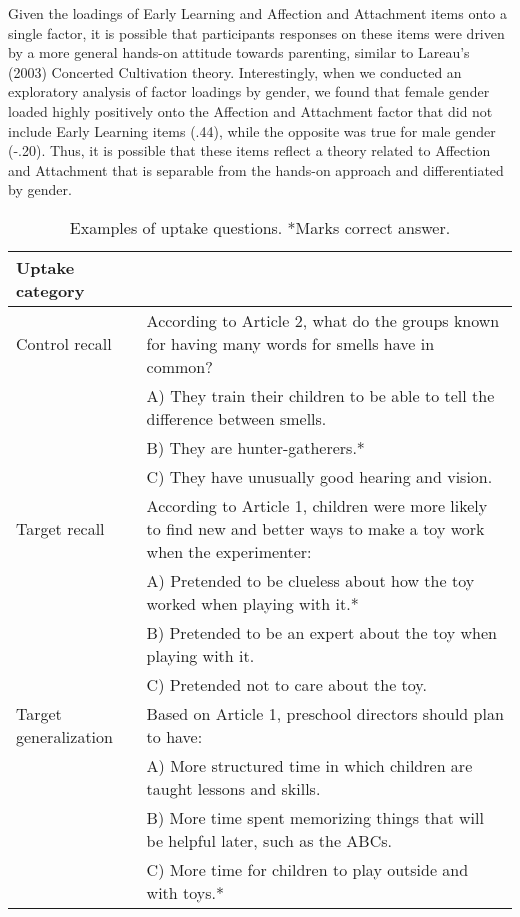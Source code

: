 \documentclass[10pt, letterpaper]{article}
\begin{document}
Given the loadings of Early Learning and Affection and Attachment items
onto a single factor, it is possible that participants responses on
these items were driven by a more general hands-on attitude towards
parenting, similar to Lareau's (2003) Concerted Cultivation theory.
Interestingly, when we conducted an exploratory analysis of factor
loadings by gender, we found that female gender loaded highly positively
onto the Affection and Attachment factor that did not include Early
Learning items (.44), while the opposite was true for male gender
(-.20). Thus, it is possible that these items reflect a theory related
to Affection and Attachment that is separable from the hands-on approach
and differentiated by gender.

\begin{table*}[!h]
\centering
\begin{tabular}{p{1.25in}p{5.25in}}
  \hline
Uptake category \\ 
  \hline
Control recall 
& According to Article 2, what do the groups known for having many words for smells have in common? \\ 
  & A) They train their children to be able to tell the difference between smells.\\ 
  & B) They are hunter-gatherers.*\\ 
  & C) They have unusually good hearing and vision.\\ 
\hline
Target recall
  & According to Article 1, children were more likely to find new and better ways to make a toy work when the experimenter:\\ 
  & A) Pretended to be clueless about how the toy worked when playing with it.*\\ 
  & B) Pretended to be an expert about the toy when playing with it.\\ 
  & C) Pretended not to care about the toy.\\ 
  \hline
  Target generalization 
  & Based on Article 1, preschool directors should plan to have:\\ 
  & A) More structured time in which children are taught lessons and skills.\\ 
  & B) More time spent memorizing things that will be helpful later, such as the ABCs.\\
  & C) More time for children to play outside and with toys.*\\
\end{tabular}
\caption{Examples of uptake questions. *Marks correct answer. \label{tab:uptake}} 
\end{table*}
\end{document}
